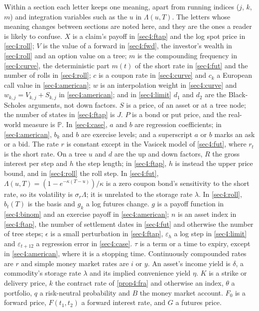 \begin{chapterrefs}
\begin{keybox}
Within a section each letter keeps one meaning, apart from running indices ($j$, $k$, $m$) and
integration variables such as the $u$ in $\Lambda(u,T)$. The letters whose meaning changes between
sections are noted here, and they are the ones a reader is likely to confuse. $X$ is a claim's payoff in \cref{sec4:ftap} and the log spot price in
\cref{sec4:roll}; $V$ is the value of a forward in \cref{sec4:fwd}, the investor's wealth in
\cref{sec4:roll} and an option value on a tree; $m$ is the compounding frequency in \cref{sec4:curve},
the deterministic part $m(t)$ of the short rate in \cref{sec4:fut} and the number of rolls in
\cref{sec4:roll}; $c$ is a coupon rate in \cref{sec4:curve} and $c_k$ a European call value in
\cref{sec4:american}; $w$ is an interpolation weight in \cref{sec4:curve} and $w_{k,j}=V_{k,j}+S_{k,j}$ in
\cref{sec4:american}; and in \cref{sec4:limit} $d_1$ and $d_2$ are the Black-Scholes arguments, not down
factors. $S$ is a price, of an asset or at a tree node; the number of states in \cref{sec4:ftap} is $J$.
$P$ is a bond or put price, and the real-world measure is $\mathbb P$. In \cref{sec4:case}, $a$ and
$b$ are regression coefficients; in \cref{sec4:american}, $b_k$ and $b$ are exercise levels; and a
superscript $a$ or $b$ marks an ask or a bid. The rate $r$ is constant except in the Vasicek model
of \cref{sec4:fut}, where $r_t$ is the short rate. On a
tree $u$ and $d$ are the up and down factors, $R$ the gross interest per step and $h$ the step
length; in \cref{sec4:ftap}, $h$ is instead the upper price bound, and in \cref{sec4:roll} the roll
step. In \cref{sec4:fut}, $\Lambda(u,T)=(1-e^{-\kappa(T-u)})/\kappa$ is a zero coupon bond's sensitivity
to the short rate, so its volatility is $\sigma_r\Lambda$; it is unrelated to the storage rate
$\lambda$. In \cref{sec4:roll}, $b_t(T)$ is the basis and $g_k$ a log futures change. $g$ is a payoff function in \cref{sec4:binom} and an exercise payoff in \cref{sec4:american}; $n$ is an
asset index in \cref{sec4:ftap}, the number of settlement dates in \cref{sec4:fut} and otherwise the
number of tree steps; $\epsilon$ is a small perturbation in \cref{sec4:ftap}, $\varepsilon_h$ a log step in
\cref{sec4:limit} and $\varepsilon_{t+12}$ a regression error in \cref{sec4:case}. $\tau$ is a term or a time to expiry, except in
\cref{sec4:american}, where it is a stopping time. Continuously compounded rates are $r$ and simple money market rates are
$i$ or $y$. An asset's income yield is $\delta$, a commodity's storage rate $\lambda$ and its implied
convenience yield $\eta$. $K$ is a strike or delivery price, $k$ the contract rate of \cref{prop4:fra} and otherwise an index, $\theta$ a
portfolio, $q$ a risk-neutral probability and $B$ the money market account. $F_0$ is a forward price, $F(t_1,t_2)$ a forward
interest rate, and $G$ a futures price.
\end{keybox}


\end{chapterrefs}
